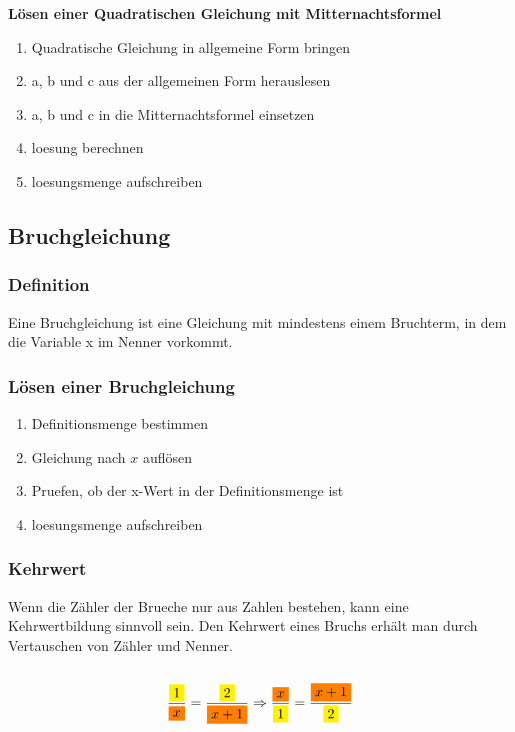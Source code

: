 \begin{multicols}{2}
    \textbf{Lösen einer Quadratischen Gleichung mit Mitternachtsformel}

    \begin{enumerate}
        \item Quadratische Gleichung in allgemeine Form bringen
        \item a, b und c aus der allgemeinen Form herauslesen
        \item  a, b und c in die Mitternachtsformel einsetzen
        \item loesung berechnen
        \item loesungsmenge aufschreiben
    \end{enumerate}

    \subsection{Bruchgleichung}
    \vspace{-4mm}
    \subsubsection{Definition}
    \vspace{-4mm}
    Eine Bruchgleichung ist eine Gleichung mit mindestens einem Bruchterm, in dem die Variable x im Nenner vorkommt.
    \subsubsection{Lösen einer Bruchgleichung}
    \vspace{-4mm}
    \begin{enumerate}
        \item Definitionsmenge bestimmen
        \item Gleichung nach $x$ auflösen
        \item Pruefen, ob der x-Wert in der Definitionsmenge ist
        \item loesungsmenge aufschreiben
    \end{enumerate}
    \subsubsection{Kehrwert}
    \vspace{-4mm}
    Wenn die Zähler der Brueche nur aus Zahlen bestehen, kann eine Kehrwertbildung sinnvoll sein.
    Den Kehrwert eines Bruchs erhält man durch Vertauschen von Zähler und Nenner.\\~\\
    \[\frac{{\colorbox{yellow}{$1$}}}{{\colorbox{orange}{$x$}}} = \frac{{\colorbox{yellow}{$2$}}}{{\colorbox{orange}{$x+1$}}} \Rightarrow  \frac{{\colorbox{orange}{$x$}}}{{\colorbox{yellow}{$1$}}} = \frac{{\colorbox{orange}{$x+1$}}}{{\colorbox{yellow}{$2$}}}\]



\end{multicols}
